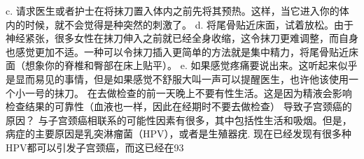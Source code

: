 \documentclass[12pt,UTF8]{ctexbook}
\begin{document}
c. 请求医生或者护士在将抹刀置入体内之前先将其预热。这样，当它进入你的体内的时候，就不会觉得是种突然的刺激了。
d. 将尾骨贴近床面，试着放松。由于神经紧张，很多女性在抹刀伸入之前就已经全身收缩，这令抹刀更难调整，而自身也感觉更加不适。一种可以令抹刀插入更简单的方法就是集中精力，将尾骨贴近床面（想象你的脊椎和臀部在床上贴平）。
e. 如果感觉疼痛要说出来。这听起来似乎是显而易见的事情，但是如果感觉不舒服大叫一声可以提醒医生，也许他该使用一个小一号的抹刀。
在去做检查的前一天晚上不要有性生活。这是因为精液会影响检查结果的可靠性（血液也一样，因此在经期时不要去做检查）
导致子宫颈癌的原因？
与子宫颈癌相联系的可能性因素有很多，其中包括性生活和吸烟。但是，病症的主要原因是乳突淋瘤菌（HPV），或者是生殖器疣. 现在已经发现有很多种HPV都可以引发子宫颈癌，而这已经在93%
\end{document}
